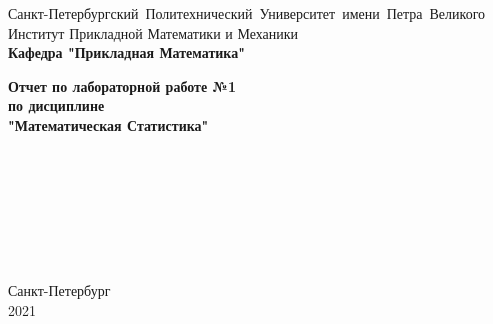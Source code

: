 \documentclass[a4paper]{article}
\author{Тырыкин Я. А. }
\date{March 2021}
\begin{document}
\begin{titlepage}
    \begin{center}
        \mbox{\normalsize{Санкт-Петербургский Политехнический Университет имени Петра Великого}}\\
        \normalsize{Институт Прикладной Математики и Механики}\\
        \large{\textbf{Кафедра "Прикладная Математика"}}
        
        \vfill
        
        \textbf{\Large{Отчет по лабораторной работе №1}}\\
        \textbf{\large{по дисциплине}}\\
        \textbf{\large"Математическая Статистика"}
        
        \vfill
        \\
        \\
        \\
        \\
        \\
        \\
        
    
        
        \vfill
    
    \end{center}
    
    \begin{center} 
        Санкт-Петербург \\
        2021 
    \end{center}
\end{titlepage}
\newpage
\end{document}
